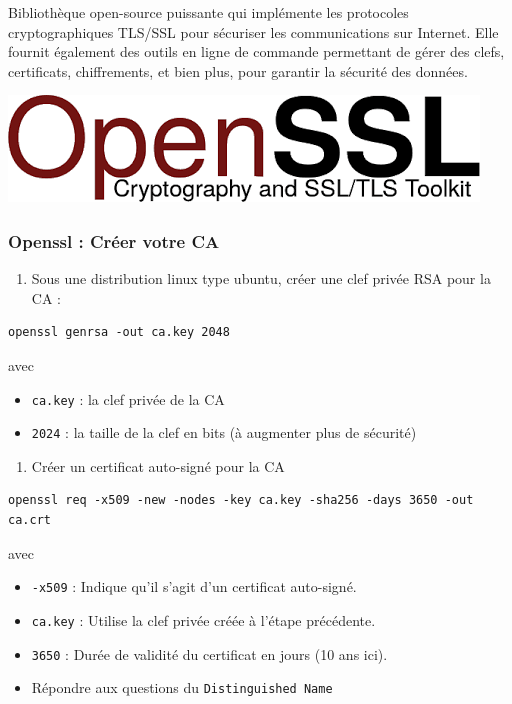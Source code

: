 \documentclass[french, 12pt]{article}%
\newcommand{\itemE}{\item[$\bullet$]}
\newcommand{\titreencadre}{Titre}
\newenvironment{encadre}[1]{\renewcommand{\titreencadre}{#1}
	\begin{mdframed}[style=encadrestyle]
	\vspace{0.5\baselineskip}
	}{%
	\end{mdframed}}
\begin{document}
\begin{encadre}{OpenSSL}
Bibliothèque open-source puissante qui implémente les protocoles cryptographiques TLS/SSL pour sécuriser les communications sur Internet. Elle fournit également des outils en ligne de commande permettant de gérer des clefs, certificats, chiffrements, et bien plus, pour garantir la sécurité des données.
\end{encadre}

\begin{center}
\includegraphics[scale=0.4]{./ressource/logoOpenSSL}
\end{center}

\subsubsection{Openssl : Créer votre CA}
\begin{enumerate}
\item Sous une distribution linux type ubuntu, créer une clef privée RSA pour la CA : 
\end{enumerate}

\begin{lstlisting}[style=commande]
openssl genrsa -out ca.key 2048
\end{lstlisting}
avec
\begin{itemize}
\itemE \verb?ca.key? : la clef privée de la CA
\itemE \verb?2024? : la taille de la clef en bits (à augmenter plus de sécurité)
\end{itemize}


\begin{enumerate}[resume]
\item Créer un certificat auto-signé pour la CA
\end{enumerate}
\begin{lstlisting}[style=commande]
openssl req -x509 -new -nodes -key ca.key -sha256 -days 3650 -out ca.crt
\end{lstlisting}
avec 

\begin{itemize}
\itemE \verb?-x509? : Indique qu'il s'agit d'un certificat auto-signé.
\itemE \verb?ca.key? : Utilise la clef privée créée à l'étape précédente.
\itemE \verb?3650? : Durée de validité du certificat en jours (10 ans ici).
\itemE Répondre aux questions du \verb?Distinguished Name?
\end{itemize}
\end{document}

